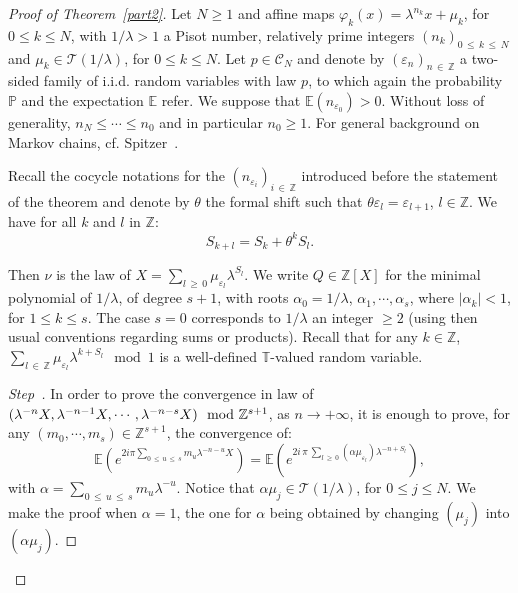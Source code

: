 \documentclass[AHL,Unicode,longabstracts,published]{cedram}
\newcommand{\Pbb}{\mathbb P}
\newcommand{\Ebb}{\mathbb E}
\newcommand{\Tbb}{\mathbb T}
\newcommand{\Zbb}{\mathbb Z}
\newcommand{\Ccl}{\mathcal{C}}
\newcommand{\Tcl}{\mathcal{T}}
\newcounter{stepcount}
\newenvironment{step}{\refstepcounter{stepcount}\begin{proof}[Step~\thestepcount]}{\let\qed\relax\end{proof}}
\begin{document}
\begin{proof}[{Proof of Theorem~\ref{part2}}]
Let $N\geq 1$ and affine maps $\varphi_k(x)=\lambda^{n_k}x+\mu_k$, for $0\leq k\leq N$, with $1/\lambda>1$ a Pisot number, relatively prime integers $(n_k)_{0\,\leq\,k\,\leq\,N}$ and $\mu_k\in {\Tcl}(1/\lambda)$, for $0\leq k\leq N$. Let $p\in{\Ccl}_N$ and denote by $(\varepsilon_n)_{n\,\in\,\Zbb}$ a two-sided family of i.i.d. random variables with law $p$, to which again the probability $\Pbb$ and the expectation $\Ebb$ refer. We suppose that $\Ebb(n_{\varepsilon_0})>0$. Without loss of generality, $n_N\leq\cdots\leq n_0$ and in particular $n_0\geq1$. For general background on Markov chains, cf. Spitzer~\cite{spitz}.


Recall the cocycle notations for the $(n_{\varepsilon_i})_{i\,\in\,\Zbb}$ introduced before the statement of the theorem and denote by $\theta$ the formal shift such that $\theta \varepsilon_l=\varepsilon_{l+1}$, $l\in\Zbb$. We have for all $k$ and $l$ in $\Zbb$:
\[
S_{k+l}=S_k+\theta^kS_l.
\]


Then $\nu$ is the law of $X=\sum_{l\,\geq\,0}\mu_{\varepsilon_l}\lambda^{S_l}$. We write $Q\in\Zbb[X]$ for the minimal polynomial of $1/\lambda$, of degree $s+1$, with roots $\alpha_0=1/\lambda$, $\alpha_1,\cdots, \alpha_s$, where $|\alpha_k|<1$, for $1\leq k\leq s$. The case $s=0$ corresponds to $1/\lambda$ an integer $\geq2$ (using then usual conventions regarding sums or products). Recall that for any $k\in\Zbb$, $\sum_{l\,\in\,\Zbb}\mu_{\varepsilon_l}\lambda^{k+S_l}\mod 1$ is a well-defined $\Tbb$-valued random variable.


\setcounter{stepcount}{0}
\begin{step}\label{sect4step1}
In order to prove the convergence in law of $(\lambda^{-n}X,\lambda^{-n-1}X,\cdots,\lambda^{-n-s}\linebreak X)\mod \Zbb^{s+1}$, as $n\rightarrow+\infty$, it is enough to prove, for any $(m_0,\cdots,m_s)\in\Zbb^{s+1}$, the convergence of:
\[
\Ebb\left({e^{2i\pi\sum_{0\,\leq\,u\,\leq\,s}m_u\lambda^{-n-u}X}}\right)=\Ebb\left({e^{2i\,\pi \,\sum_{l\,\geq\,0}(\alpha\mu_{\varepsilon_l})\lambda^{-n+S_l}}}\right),
\]
with $\alpha=\sum_{0\,\leq\,u\,\leq\,s}m_u\lambda^{-u}$. Notice that $\alpha\mu_j\in{\Tcl}(1/\lambda)$, for $0\leq j\leq N$. We make the proof when $\alpha=1$, the one for $\alpha$ being obtained by changing $(\mu_j)$ into $(\alpha\mu_j)$.


\end{step}
\end{proof}
\end{document}
